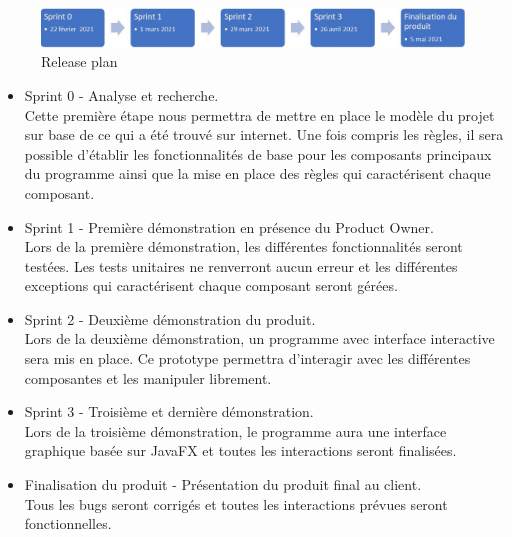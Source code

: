 \begin{figure}[h]
	\centering
	\includegraphics[width=\textwidth]{plan.jpg}
	\caption{Release plan}
	\label{fig:plan}
\end{figure}
\begin{itemize}
	\item Sprint 0 - Analyse et recherche.\\
	Cette première étape nous permettra de mettre en place le modèle du projet sur base de ce qui a été trouvé sur internet. Une fois compris les règles, il sera possible d'établir les fonctionnalités de base pour les composants principaux du programme ainsi que la mise en place des règles qui caractérisent chaque composant.
	\item Sprint 1 - Première démonstration en présence du Product Owner.\\
	Lors de la première démonstration, les différentes fonctionnalités seront testées. Les tests unitaires ne renverront aucun erreur et les différentes exceptions qui caractérisent chaque composant seront gérées.
	\item Sprint 2 - Deuxième démonstration du produit.\\
	Lors de la deuxième démonstration, un programme avec interface interactive sera mis en place. Ce prototype permettra d'interagir avec les différentes composantes et les manipuler librement.
	\item Sprint 3 - Troisième et dernière démonstration.\\
	Lors de la troisième démonstration, le programme aura une interface graphique basée sur JavaFX et toutes les interactions seront finalisées.
	\item Finalisation du produit - Présentation du produit final au client.\\
	Tous les bugs seront corrigés et toutes les interactions prévues seront fonctionnelles.
\end{itemize}